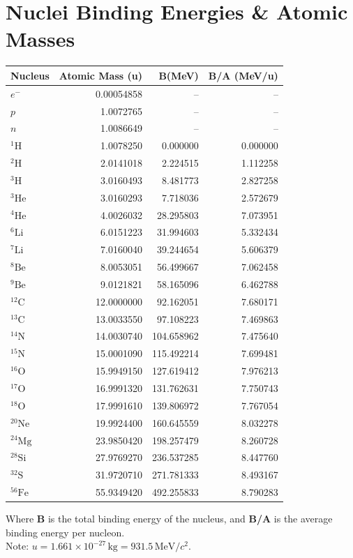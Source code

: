 \section{Nuclei Binding Energies \& Atomic Masses}
\begin{center}
\begin{tabular}{lrrr}
\toprule
\textbf{Nucleus} & \textbf{Atomic Mass (u)} & \textbf{B(MeV)} & \textbf{B/A (MeV/u)} \\
\midrule
$e^-$ & 0.00054858 & -- & -- \\
$p$ & 1.0072765 & -- & -- \\
$n$ & 1.0086649 & -- & -- \\
$^1\mathrm{H}$ & 1.0078250 & 0.000000 & 0.000000 \\
$^2\mathrm{H}$ & 2.0141018 & 2.224515 & 1.112258 \\
$^3\mathrm{H}$ & 3.0160493 & 8.481773 & 2.827258 \\
$^3\mathrm{He}$ & 3.0160293 & 7.718036 & 2.572679 \\
$^4\mathrm{He}$ & 4.0026032 & 28.295803 & 7.073951 \\
$^6\mathrm{Li}$ & 6.0151223 & 31.994603 & 5.332434 \\
$^7\mathrm{Li}$ & 7.0160040 & 39.244654 & 5.606379 \\
$^8\mathrm{Be}$ & 8.0053051 & 56.499667 & 7.062458 \\
$^9\mathrm{Be}$ & 9.0121821 & 58.165096 & 6.462788 \\
$^{12}\mathrm{C}$ & 12.0000000 & 92.162051 & 7.680171 \\
$^{13}\mathrm{C}$ & 13.0033550 & 97.108223 & 7.469863 \\
$^{14}\mathrm{N}$ & 14.0030740 & 104.658962 & 7.475640 \\
$^{15}\mathrm{N}$ & 15.0001090 & 115.492214 & 7.699481 \\
$^{16}\mathrm{O}$ & 15.9949150 & 127.619412 & 7.976213 \\
$^{17}\mathrm{O}$ & 16.9991320 & 131.762631 & 7.750743 \\
$^{18}\mathrm{O}$ & 17.9991610 & 139.806972 & 7.767054 \\
$^{20}\mathrm{Ne}$ & 19.9924400 & 160.645559 & 8.032278 \\
$^{24}\mathrm{Mg}$ & 23.9850420 & 198.257479 & 8.260728 \\
$^{28}\mathrm{Si}$ & 27.9769270 & 236.537285 & 8.447760 \\
$^{32}\mathrm{S}$ & 31.9720710 & 271.781333 & 8.493167 \\
$^{56}\mathrm{Fe}$ & 55.9349420 & 492.255833 & 8.790283 \\
\bottomrule
\end{tabular}
\end{center}
Where \textbf{B} is the total binding energy of the nucleus, and \textbf{B/A} is the average binding energy per nucleon. \\

Note: $u = 1.661\times10^{-27}\,\mathrm{kg} = 931.5\,\mathrm{MeV}/c^2$.



\clearpage
